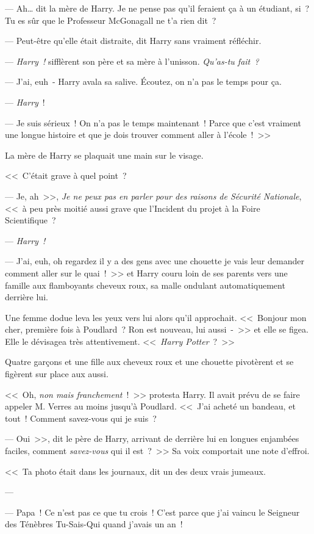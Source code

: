 --- Ah… dit la mère de Harry. Je ne pense pas qu'il feraient ça à un étudiant, si~? Tu es sûr que le Professeur McGonagall ne t'a rien dit~?

--- Peut-être qu'elle était distraite, dit Harry sans vraiment réfléchir.

--- \emph{Harry~!} sifflèrent son père et sa mère à l'unisson. \emph{Qu'as-tu fait~?}

--- J'ai, euh~- Harry avala sa salive. Écoutez, on n'a pas le temps pour ça.

--- \emph{Harry}~!

--- Je suis sérieux~! On n'a pas le temps maintenant~! Parce que c'est vraiment une longue histoire et que je dois trouver comment aller à l'école~!~>>

La mère de Harry se plaquait une main sur le visage. 

<<~C'était grave à quel point~?

--- Je, ah~>>, \emph{Je ne peux pas en parler pour des raisons de Sécurité Nationale}, <<~à peu près moitié aussi grave que l'Incident du projet à la Foire Scientifique~?

--- \emph{Harry~!}

--- J'ai, euh, oh regardez il y a des gens avec une chouette je vais leur demander comment aller sur le quai~!~>> et Harry couru loin de ses parents vers une famille aux flamboyants cheveux roux, sa malle ondulant automatiquement derrière lui.

Une femme dodue leva les yeux vers lui alors qu'il approchait. <<~Bonjour mon cher, première fois à Poudlard~? Ron est nouveau, lui aussi~-~>> et elle se figea. Elle le dévisagea très attentivement. <<~\emph{Harry Potter}~?~>>

Quatre garçons et une fille aux cheveux roux et une chouette pivotèrent et se figèrent sur place aux aussi.

<<~Oh, \emph{non mais franchement}~!~>> protesta Harry. Il avait prévu de se faire appeler M. Verres au moins jusqu'à Poudlard. <<~J'ai acheté un bandeau, et tout~! Comment savez-vous qui je suis~?

--- Oui~>>, dit le père de Harry, arrivant de derrière lui en longues enjambées faciles, comment \emph{savez-vous} qui il est~?~>> Sa voix comportait une note d'effroi.

<<~Ta photo était dans les journaux, dit un des deux vrais jumeaux.

--- 

--- Papa~! Ce n'est pas ce que tu crois~! C'est parce que j'ai vaincu le Seigneur des Ténèbres Tu-Sais-Qui quand j'avais un an~!

